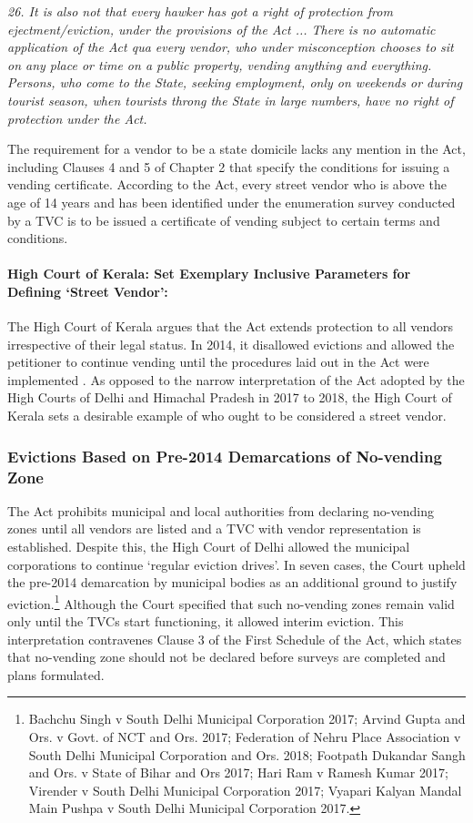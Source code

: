\documentclass[a4paper, 12pt, twoside, table]{article}
\begin{document}
{\textit{26. It is also not that every hawker has got a right of protection from ejectment/eviction, under the provisions of the Act ... There is no automatic application of the Act qua every vendor, who under misconception chooses to sit on any place or time on a public property, vending anything and everything. Persons, who come to the State, seeking employment, only on weekends or during tourist season, when tourists throng the State in large numbers, have no right of protection under the Act.}

The requirement for a vendor to be a state domicile lacks any mention in the Act, including Clauses 4 and 5 of Chapter 2 that specify the conditions for issuing a vending certificate. According to the Act, every street vendor who is above the age of 14 years and has been identified under the enumeration survey conducted by a TVC is to be issued a certificate of vending subject to certain terms and conditions. 

\paragraph*{High Court of Kerala: Set Exemplary Inclusive Parameters for Defining `Street Vendor':}

The High Court of Kerala argues that the Act extends protection to all vendors irrespective of their legal status. In 2014, it disallowed evictions and allowed the petitioner to continue vending until the procedures laid out in the Act were implemented \parencite{Thankappan}. As opposed to the narrow interpretation of the Act adopted by the High Courts of Delhi and Himachal Pradesh in 2017 to 2018, the High Court of Kerala sets a desirable example of who ought to be considered a street vendor.

\subsubsection*{Evictions Based on Pre-2014 Demarcations of No-vending Zone}

The Act prohibits municipal and local authorities from declaring no-vending zones until all vendors are listed and a TVC with vendor representation is established. Despite this, the High Court of Delhi allowed the municipal corporations to continue `regular eviction drives'. In seven cases, the Court upheld the pre-2014 demarcation by municipal bodies as an additional ground to justify eviction.\footnote{ Bachchu Singh v South Delhi Municipal Corporation 2017; Arvind Gupta and Ors. v Govt. of NCT and Ors. 2017; Federation of Nehru Place Association v South Delhi Municipal Corporation and Ors. 2018; Footpath Dukandar Sangh and Ors. v State of Bihar and Ors 2017; Hari Ram v Ramesh Kumar 2017; Virender v South Delhi Municipal Corporation 2017; Vyapari Kalyan Mandal Main Pushpa v South Delhi Municipal Corporation 2017.}  Although the Court specified that such no-vending zones remain valid only until the TVCs start functioning, it allowed interim eviction. This interpretation contravenes Clause 3 of the First Schedule of the Act, which states that no-vending zone should not be declared before surveys are completed and plans formulated.

}
\end{document}
